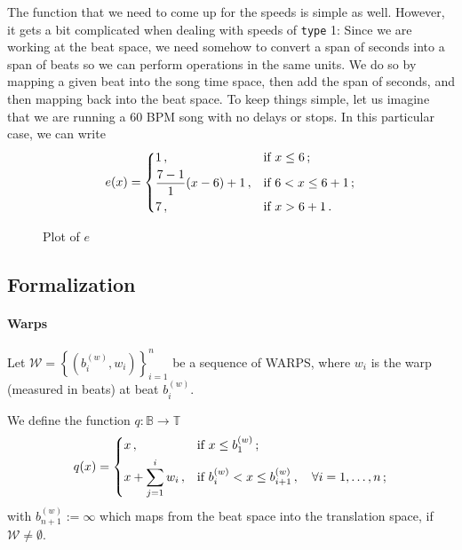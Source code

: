 \documentclass[a4paper,9pt]{article}
\begin{document}
The function that we need to come up for the speeds is simple as well. However, it gets a bit complicated when dealing with speeds of \texttt{type} 1:
Since we are working at the beat space, we need somehow to convert a span of seconds into a span of beats so we can perform operations in the same units. We do so by mapping a given beat into the song time space, then add the span of seconds, and then mapping back into the beat space. To keep things simple, let us imagine that we are running a 60 BPM song with no delays or stops.
In this particular case, we can write 
\begin{equation}
	e(x) = \begin{dcases}
		1\,, & \text{if $ x \leq 6 $}\,;\\
		\frac{7-1}{1}(x-6)+1\,, & \text{if $ 6 < x \leq 6+1 $}\,;\\
		7\,, & \text{if $ x > 6+1 $}\,.
	\end{dcases}
	\label{eq:example-speeds}
\end{equation}

\begin{figure}[htpb]
	\centering
\caption{Plot of $ e $}
	\label{fig:speeds-example}
\end{figure}


\subsection{Formalization}

\paragraph{Warps}
Let $ \mathcal{W} =  \left\{\left( b_i^{(w)}, w_i \right)\right\}_{i=1}^{n} $ be a sequence of WARPS, where $ w_i $ is the warp (measured in beats) at beat $ b_i^{(w)} $. 

We define the function $ q: \mathbb{B}\rightarrow \mathbb{T} $
\begin{equation}
	q(x) = \begin{dcases}
		x\,, & \text{if $ x \leq b^{(w)}_1 $}\,;\\
		x+ \sum_{j=1}^{i}w_i\,, & \text{if $ b^{(w)}_i < x \leq b^{(w)}_{i+1}\,,\quad \forall i=1,\dots,n$}\,;\\
	\end{dcases}
	\label{eq:q-1}
\end{equation}
with $ b^{(w)}_{n+1} := \infty $ which maps from the beat space into the translation space, if $ \mathcal{W} \neq \emptyset $.
\end{document}
